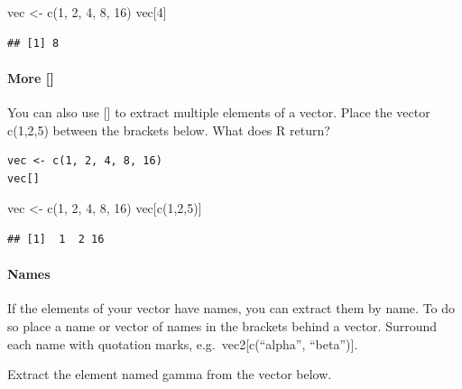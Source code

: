 \documentclass[
]{article}
\newenvironment{Shaded}{\begin{snugshade}}{\end{snugshade}}
\newcommand{\DecValTok}[1]{\textcolor[rgb]{0.00,0.00,0.81}{#1}}
\newcommand{\FunctionTok}[1]{\textcolor[rgb]{0.00,0.00,0.00}{#1}}
\newcommand{\NormalTok}[1]{#1}
\newcommand{\OtherTok}[1]{\textcolor[rgb]{0.56,0.35,0.01}{#1}}
\begin{document}
\begin{Shaded}
\begin{Highlighting}[]
\NormalTok{vec }\OtherTok{\textless{}{-}} \FunctionTok{c}\NormalTok{(}\DecValTok{1}\NormalTok{, }\DecValTok{2}\NormalTok{, }\DecValTok{4}\NormalTok{, }\DecValTok{8}\NormalTok{, }\DecValTok{16}\NormalTok{)}
\NormalTok{vec[}\DecValTok{4}\NormalTok{]}
\end{Highlighting}
\end{Shaded}

\begin{verbatim}
## [1] 8
\end{verbatim}

\hypertarget{more}{%
\paragraph{More {[}{]}}\label{more}}

You can also use {[}{]} to extract multiple elements of a vector. Place
the vector c(1,2,5) between the brackets below. What does R return?

\begin{verbatim}
vec <- c(1, 2, 4, 8, 16)
vec[]
\end{verbatim}

\begin{Shaded}
\begin{Highlighting}[]
\NormalTok{vec }\OtherTok{\textless{}{-}} \FunctionTok{c}\NormalTok{(}\DecValTok{1}\NormalTok{, }\DecValTok{2}\NormalTok{, }\DecValTok{4}\NormalTok{, }\DecValTok{8}\NormalTok{, }\DecValTok{16}\NormalTok{)}
\NormalTok{vec[}\FunctionTok{c}\NormalTok{(}\DecValTok{1}\NormalTok{,}\DecValTok{2}\NormalTok{,}\DecValTok{5}\NormalTok{)]}
\end{Highlighting}
\end{Shaded}

\begin{verbatim}
## [1]  1  2 16
\end{verbatim}

\hypertarget{names}{%
\paragraph{Names}\label{names}}

If the elements of your vector have names, you can extract them by name.
To do so place a name or vector of names in the brackets behind a
vector. Surround each name with quotation marks,
e.g.~vec2{[}c(``alpha'', ``beta''){]}.

Extract the element named gamma from the vector below.
\end{document}
